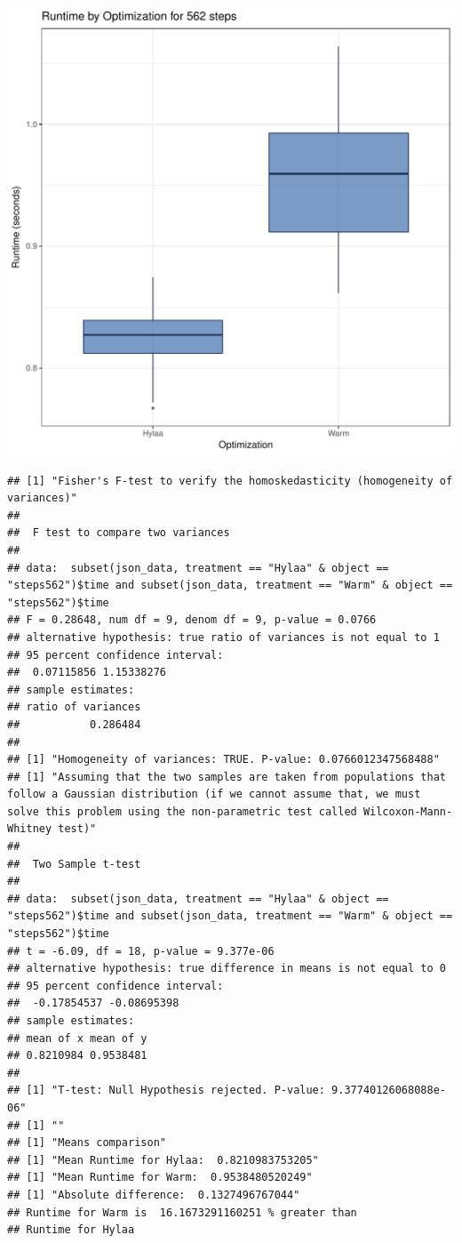 \documentclass{article}\usepackage[]{graphicx}\usepackage[]{color}
\makeatletter
\def\maxwidth{ %
  \ifdim\Gin@nat@width>\linewidth
    \linewidth
  \else
    \Gin@nat@width
  \fi
}
\newenvironment{kframe}{%
 \def\at@end@of@kframe{}%
 \ifinner\ifhmode%
  \def\at@end@of@kframe{\end{minipage}}%
  \begin{minipage}{\columnwidth}%
 \fi\fi%
 \def\FrameCommand##1{\hskip\@totalleftmargin \hskip-\fboxsep
 \colorbox{shadecolor}{##1}\hskip-\fboxsep
     \hskip-\linewidth \hskip-\@totalleftmargin \hskip\columnwidth}%
 \MakeFramed {\advance\hsize-\width
   \@totalleftmargin\z@ \linewidth\hsize
   \@setminipage}}%
 {\par\unskip\endMakeFramed%
 \at@end@of@kframe}
\newenvironment{knitrout}{}{} %
\makeatother
\begin{document}
\begin{knitrout}
\color{fgcolor}
\includegraphics[width=\maxwidth]{figure/RH1_steps562-1} 
\begin{kframe}\begin{verbatim}
## [1] "Fisher's F-test to verify the homoskedasticity (homogeneity of variances)"
## 
## 	F test to compare two variances
## 
## data:  subset(json_data, treatment == "Hylaa" & object == "steps562")$time and subset(json_data, treatment == "Warm" & object == "steps562")$time
## F = 0.28648, num df = 9, denom df = 9, p-value = 0.0766
## alternative hypothesis: true ratio of variances is not equal to 1
## 95 percent confidence interval:
##  0.07115856 1.15338276
## sample estimates:
## ratio of variances 
##           0.286484 
## 
## [1] "Homogeneity of variances: TRUE. P-value: 0.0766012347568488"
## [1] "Assuming that the two samples are taken from populations that follow a Gaussian distribution (if we cannot assume that, we must solve this problem using the non-parametric test called Wilcoxon-Mann-Whitney test)"
## 
## 	Two Sample t-test
## 
## data:  subset(json_data, treatment == "Hylaa" & object == "steps562")$time and subset(json_data, treatment == "Warm" & object == "steps562")$time
## t = -6.09, df = 18, p-value = 9.377e-06
## alternative hypothesis: true difference in means is not equal to 0
## 95 percent confidence interval:
##  -0.17854537 -0.08695398
## sample estimates:
## mean of x mean of y 
## 0.8210984 0.9538481 
## 
## [1] "T-test: Null Hypothesis rejected. P-value: 9.37740126068088e-06"
## [1] ""
## [1] "Means comparison"
## [1] "Mean Runtime for Hylaa:  0.8210983753205"
## [1] "Mean Runtime for Warm:  0.9538480520249"
## [1] "Absolute difference:  0.1327496767044"
## Runtime for Warm is  16.1673291160251 % greater than 
## Runtime for Hylaa
\end{verbatim}
\end{kframe}
\end{knitrout}
\end{document}
